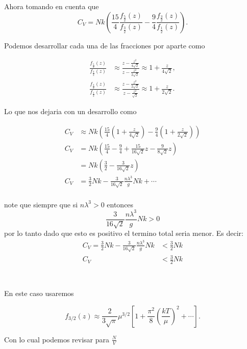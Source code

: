 \documentclass{report}
\begin{document}
Ahora tomando en cuenta que
\[
C_V = Nk \left( \frac{15}{4} \frac{f_{\frac{5}{2}}(z)}{f_{\frac{3}{2}}(z)} - \frac{9}{4} \frac{f_{\frac{3}{2}}(z)}{f_{\frac{1}{2}}(z)} \right).
\]

Podemos desarrollar cada una de las fracciones por aparte como

\begin{align*}
\frac{f_{\frac{5}{2}}(z)}{f_{\frac{3}{2}}(z)} &\approx \frac{z - \frac{z^2}{4\sqrt{2}}}{z - \frac{z^2}{2\sqrt{2}}} \approx 1 + \frac{z}{4\sqrt{2}}, \\
\frac{f_{\frac{3}{2}}(z)}{f_{\frac{1}{2}}(z)} &\approx \frac{z - \frac{z^2}{2\sqrt{2}}}{z - \frac{z^2}{\sqrt{2}}} \approx 1 + \frac{z}{2\sqrt{2}}.
\end{align*}

Lo que nos dejaria con un desarrollo como

\begin{align*}
  C_V &\approx Nk \left( \frac{15}{4} \left(1 + \frac{z}{4\sqrt{2}} \right) - \frac{9}{4} \left(1 + \frac{z}{2\sqrt{2}} \right) \right)\\
  C_V &= Nk \left( \frac{15}{4} - \frac{9}{4} + \frac{15}{16\sqrt{2}} z - \frac{9}{8\sqrt{2}} z \right)\\ &= Nk \left( \frac{3}{2} - \frac{3}{16\sqrt{2}} z \right)\\
  C_V &= \frac{3}{2}Nk - \frac{3}{16\sqrt{2}} \frac{n\lambda^3}{g} Nk + \cdots\\
\end{align*}

note que siempre que si $n\lambda^3 > 0$ entonces \[\frac{3}{16\sqrt{2}} \frac{n\lambda^3}{g} Nk > 0\] por lo tanto dado que esto es positivo el termino total seria menor. Es decir:
\begin{align*}
  C_V = \frac{3}{2}Nk - \frac{3}{16\sqrt{2}} \frac{n\lambda^3}{g} Nk &< \frac{3}{2}Nk\\
  C_V &< \frac{3}{2}Nk\\
\end{align*}

\section{}

En este caso usaremos

\[
f_{3/2}(z) \approx \frac{2}{3\sqrt{\pi}} \mu^{3/2} \left[ 1 + \frac{\pi^2}{8} \left( \frac{kT}{\mu} \right)^2 + \cdots \right].
\]

Con lo cual podemos revisar para $\frac{N}{V}$
\end{document}
